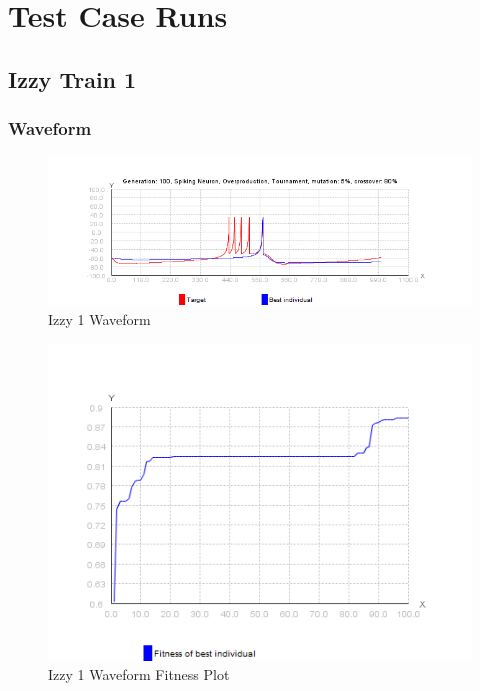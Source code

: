 \documentclass[titlepage,norsk]{article}
\begin{document}
\section{Test Case Runs}

\subsection{Izzy Train 1}

\subsubsection{Waveform}

\begin{figure}[h!]
\centering
\includegraphics[scale=0.75]{izzy1wave.png}
\caption{Izzy 1 Waveform}
\label{fig:awesome_image}
\end{figure}

\begin{figure}[h!]
\centering
\includegraphics[scale=0.75]{izzy1waveFitness.png}
\caption{Izzy 1 Waveform Fitness Plot}
\label{fig:awesome_image}
\end{figure}
\end{document}
